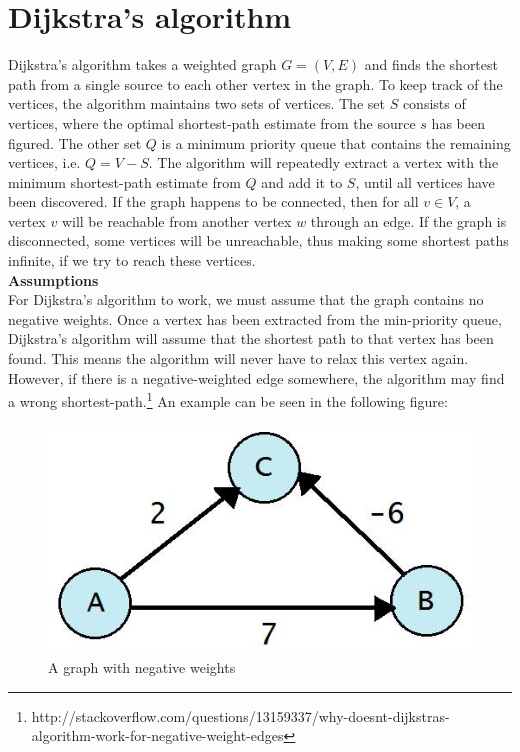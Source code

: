 \documentclass[11pt]{article}
\begin{document}
\section{Dijkstra's algorithm}
Dijkstra's algorithm takes a weighted graph $G = (V, E)$ and finds the shortest path from a single source to each other vertex in the graph. To keep track of the vertices, the algorithm maintains two sets of vertices. The set $S$ consists of vertices, where the optimal shortest-path estimate from the source $s$ has been figured. The other set $Q$ is a minimum priority queue that contains the remaining vertices, i.e. $Q = V - S$. The algorithm will repeatedly extract a vertex with the minimum shortest-path estimate from $Q$ and add it to $S$, until all vertices have been discovered. If the graph happens to be connected, then for all $v \in V $, a vertex $v$ will be reachable from another vertex $w$ through an edge. If the graph is disconnected, some vertices will be unreachable, thus making some shortest paths infinite, if we try to reach these vertices.\\

\noindent 
\textbf{Assumptions}\\
For Dijkstra's algorithm to work, we must assume that the graph contains no negative weights. Once a vertex has been extracted from the min-priority queue, Dijkstra's algorithm will assume that the shortest path to that vertex has been found. This means the algorithm will never have to relax this vertex again. However, if there is a negative-weighted edge somewhere, the algorithm may find a wrong shortest-path.\footnote{http://stackoverflow.com/questions/13159337/why-doesnt-dijkstras-algorithm-work-for-negative-weight-edges} An example can be seen in the following figure:\\

\begin{figure}[H]
\centering
\includegraphics[scale=0.3]{neg-weight.png}
\caption{A graph with negative weights}
\end{figure}
\end{document}
